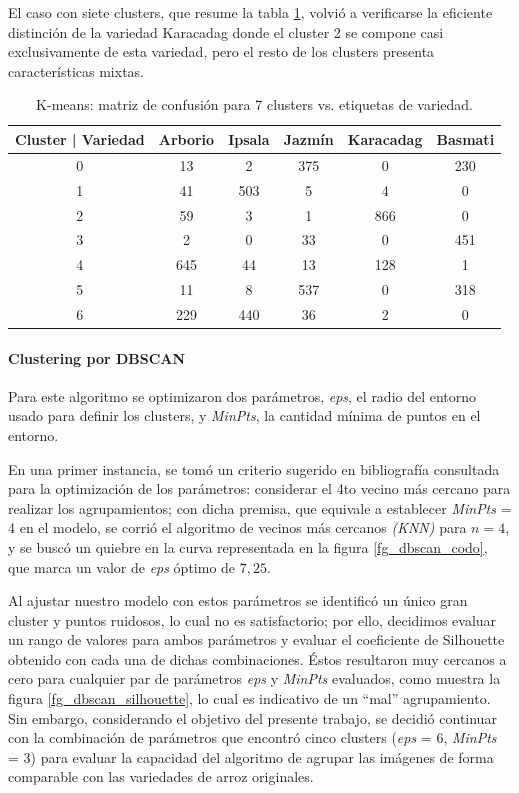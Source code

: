 \documentclass{article}
\begin{document}
El caso con siete clusters, que resume la tabla \ref{tab:mc_kmeans7}, volvió a verificarse la eficiente distinción de la variedad Karacadag donde el cluster 2 se compone casi exclusivamente de esta variedad, pero el resto de los clusters presenta características mixtas.

\begin{table}
    \centering
    \begin{tabular}{cccccc}
    \toprule
    Cluster | Variedad &  Arborio&  Ipsala&  Jazmín&  Karacadag& Basmati\\
    \midrule
    0 & 13 & 2 & 375 & 0 & 230 \\
    1 & 41 & 503 & 5 & 4 & 0 \\
    2 & 59 & 3 & 1 & 866 & 0 \\
    3 & 2 & 0 & 33 & 0 & 451 \\
    4 & 645 & 44 & 13& 128 & 1 \\
    5 & 11 & 8 & 537 & 0 & 318 \\
    6 & 229 & 440 & 36 & 2 & 0 \\
    \bottomrule
    \end{tabular}
    \caption{K-means: matriz de confusión para 7 clusters vs. etiquetas de variedad.}
    \label{tab:mc_kmeans7}
\end{table}


\paragraph{Clustering por DBSCAN}
Para este algoritmo se optimizaron dos parámetros, \textit{eps}, el radio del entorno usado para definir los clusters, y \textit{MinPts}, la cantidad mínima de puntos en el entorno.

En una primer instancia, se tomó un criterio sugerido en bibliografía consultada para la optimización de los parámetros: considerar el 4to vecino más cercano para realizar los agrupamientos; con dicha premisa, que equivale a establecer  \textit{MinPts} = 4 en el modelo, se corrió el algoritmo de vecinos más cercanos \textit{(KNN)} para \(n = 4\), y se buscó un quiebre en la curva representada en la figura \ref{fg_dbscan_codo}, que marca un valor de \textit{eps} óptimo de \(7,25\).

Al ajustar nuestro modelo con estos parámetros se identificó un único gran cluster y puntos ruidosos, lo cual no es satisfactorio; por ello, decidimos evaluar un rango de valores para ambos parámetros y evaluar el coeficiente de Silhouette obtenido con cada una de dichas combinaciones. Éstos resultaron muy cercanos a cero para cualquier par de parámetros \textit{eps} y \textit{MinPts} evaluados, como muestra la figura \ref{fg_dbscan_silhouette}, lo cual es indicativo de un ``mal'' agrupamiento.
Sin embargo, considerando el objetivo del presente trabajo, se decidió continuar con la combinación de parámetros que encontró cinco clusters (\textit{eps} = 6, \textit{MinPts} = 3) para evaluar la capacidad del algoritmo de agrupar las imágenes de forma comparable con las variedades de arroz originales. 
\end{document}
